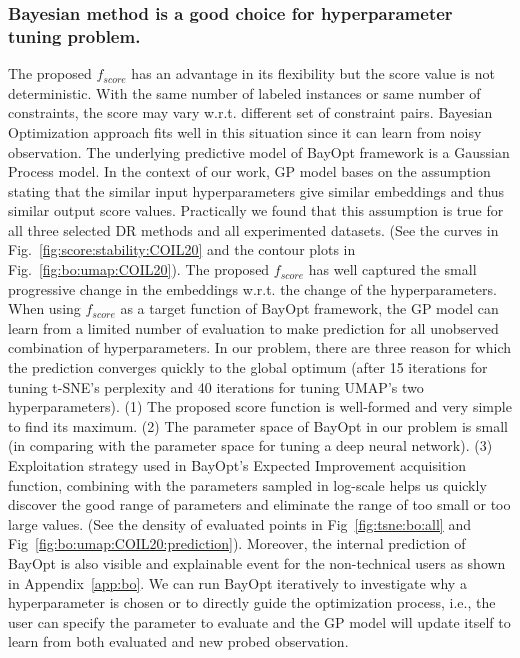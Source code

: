 \subsubsection*{Bayesian method is a good choice for hyperparameter tuning problem.}
The proposed $f_{score}$ has an advantage in its flexibility but the score value is not deterministic.
With the same number of labeled instances or same number of constraints, the score may vary w.r.t. different set of constraint pairs.
Bayesian Optimization approach fits well in this situation since it can learn from noisy observation.
The underlying predictive model of BayOpt framework is a Gaussian Process model.
In the context of our work, GP model bases on the assumption stating that the similar input hyperparameters give similar embeddings and thus similar output score values.
Practically we found that this assumption is true for all three selected DR methods and all experimented datasets. (See the curves in Fig.~\ref{fig:score:stability:COIL20} and the contour plots in Fig.~\ref{fig:bo:umap:COIL20}).
The proposed $f_{score}$ has well captured the small progressive change in the embeddings w.r.t. the change of the hyperparameters.
When using $f_{score}$ as a target function of BayOpt framework, the GP model can learn from a limited number of evaluation to make prediction for all unobserved combination of hyperparameters.
In our problem, there are three reason for which the prediction converges quickly to the global optimum (after 15 iterations for tuning t-SNE's perplexity and 40 iterations for tuning UMAP's two hyperparameters).
(1) The proposed score function is well-formed and very simple to find its maximum.
(2) The parameter space of BayOpt in our problem is small (in comparing with the parameter space for tuning a deep neural network).
(3) Exploitation strategy used in BayOpt's Expected Improvement acquisition function, combining with the parameters sampled in log-scale helps us quickly discover the good range of parameters and eliminate the range of too small or too large values. (See the density of evaluated points in Fig~\ref{fig:tsne:bo:all} and Fig~\ref{fig:bo:umap:COIL20:prediction}).
Moreover, the internal prediction of BayOpt is also visible and explainable event for the non-technical users as shown in Appendix~\ref{app:bo}.
We can run BayOpt iteratively to investigate why a hyperparameter is chosen or to directly guide the optimization process, i.e., the user can specify the parameter to evaluate and the GP model will update itself to learn from both evaluated and new probed observation.

